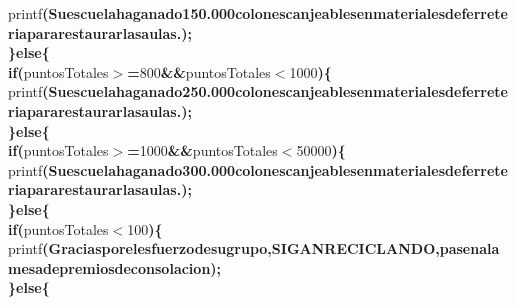 \documentclass[a4paper, 10pt]{article}
\newcommand\SPC{\hspace*{0.6em}}
\newcommand\TAB{\hspace*{1.2em}}
\newcommand\QOT{\mbox{\char 34}}
\newcommand{\CppAIdentifier}[1]{#1}
\newcommand{\CppANumber}[1]{\textcolor[rgb]{0.5,0,0.5}{#1}}
\newcommand{\CppAReservedWord}[1]{\textbf{#1}}
\newcommand{\CppASpace}[1]{\colorbox[rgb]{1,1,1}{#1}}
\newcommand{\CppAString}[1]{\textbf{\textcolor[rgb]{0,0,1}{#1}}}
\newcommand{\CppASymbol}[1]{\textbf{\textcolor[rgb]{1,0,0}{#1}}}
\begin{document}
\begin{ttfamily}
\CppASpace{\TAB \TAB }\CppAIdentifier{printf}\CppASymbol{(}\CppAString{\QOT Su\SPC escuela\SPC ha\SPC ganado\SPC 150.000\SPC colones\SPC canjeables\SPC en\SPC materiales\SPC de\SPC ferreteria\SPC para\SPC restaurar\SPC las\SPC aulas.\QOT }\CppASymbol{)}\CppASymbol{;}\\
\CppASpace{\TAB }\CppASymbol{\}}\CppAReservedWord{else}\CppASymbol{\{}\\
\CppASpace{\TAB \TAB }\CppAReservedWord{if}\CppASpace{\SPC }\CppASymbol{(}\CppAIdentifier{puntosTotales}\CppASymbol{$>$=}\CppANumber{800}\CppASpace{\SPC }\CppASymbol{\&\&}\CppASpace{\SPC }\CppAIdentifier{puntosTotales}\CppASymbol{$<$}\CppANumber{1000}\CppASymbol{)}\CppASpace{\SPC }\CppASymbol{\{}\\
\CppASpace{\TAB \TAB }\CppAIdentifier{printf}\CppASymbol{(}\CppAString{\QOT Su\SPC escuela\SPC ha\SPC ganado\SPC 250.000\SPC colones\SPC canjeables\SPC en\SPC materiales\SPC de\SPC ferreteria\SPC para\SPC restaurar\SPC las\SPC aulas.\QOT }\CppASymbol{)}\CppASymbol{;}\\
\CppASpace{\TAB }\CppASymbol{\}}\CppAReservedWord{else}\CppASymbol{\{}\\
\CppASpace{\TAB \TAB }\CppAReservedWord{if}\CppASpace{\SPC }\CppASymbol{(}\CppAIdentifier{puntosTotales}\CppASymbol{$>$=}\CppANumber{1000}\CppASpace{\SPC }\CppASymbol{\&\&}\CppASpace{\SPC }\CppAIdentifier{puntosTotales}\CppASymbol{$<$}\CppANumber{50000}\CppASymbol{)}\CppASpace{\SPC }\CppASymbol{\{}\\
\CppASpace{\TAB \TAB }\CppAIdentifier{printf}\CppASymbol{(}\CppAString{\QOT Su\SPC escuela\SPC ha\SPC ganado\SPC 300.000\SPC colones\SPC canjeables\SPC en\SPC materiales\SPC de\SPC ferreteria\SPC para\SPC restaurar\SPC las\SPC aulas.\QOT }\CppASymbol{)}\CppASymbol{;}\\
\CppASpace{\TAB }\CppASymbol{\}}\CppAReservedWord{else}\CppASymbol{\{}\\
\CppASpace{\TAB \TAB }\CppAReservedWord{if}\CppASpace{\SPC }\CppASymbol{(}\CppAIdentifier{puntosTotales}\CppASymbol{$<$}\CppANumber{100}\CppASymbol{)}\CppASpace{\SPC }\CppASymbol{\{}\\
\CppASpace{\TAB \TAB }\CppAIdentifier{printf}\CppASymbol{(}\CppAString{\QOT Gracias\SPC por\SPC el\SPC esfuerzo\SPC de\SPC su\SPC grupo,\SPC SIGAN\SPC RECICLANDO,\SPC pasen\SPC a\SPC la\SPC mesa\SPC de\SPC premios\SPC de\SPC consolacion\QOT }\CppASymbol{)}\CppASymbol{;}\\
\CppASpace{\TAB }\CppASymbol{\}}\CppAReservedWord{else}\CppASymbol{\{}\\

\end{ttfamily}
\end{document}
